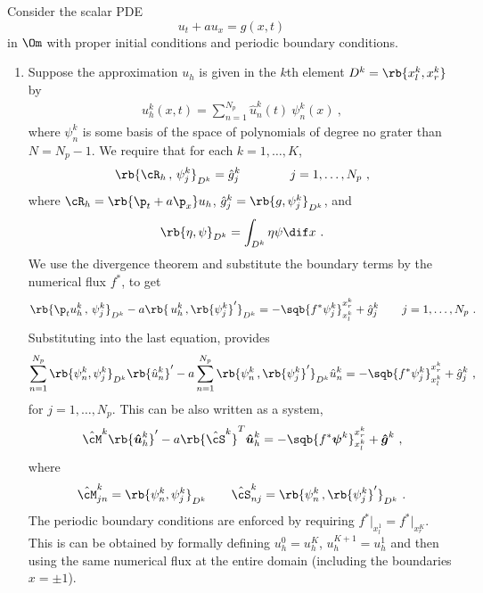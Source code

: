 \documentclass{article}
\def\hbu{\boldsymbol{\hat u}}
\def\bpsi{\boldsymbol{\psi}}
\def\bpsi{\boldsymbol{\psi}}
\def\hbForce{\boldsymbol{\hat g}}
\begin{document}
\begin{exerciseList}
\item
Consider the scalar PDE
\begin{equation}
	u_t+au_x=g(x,t)
\end{equation}
in $\Om$ with proper initial conditions and periodic boundary conditions.
\begin{enumerate}

\item
Suppose the approximation $u_h$ is given in the $k$th element $D^k=\rb{x_l^k,x_r^k}$ by
\begin{gather} \label{uh_def}
	u_h^k(x,t)=\sum_{n=1}^{N_p} \hat u_n^k(t)\ \psi_n^k(x)\ ,
\end{gather}
where $\psi_n^k$ is some basis of the space of polynomials of degree no grater than $N=N_p-1$.
We require that for each $k=1,\ldots,K$,
\begin{gather}
	\rb{\cR_h\, ,\, \psi_j^k}_{D^k}=\hat g_j^k
	\qquad\qquad j=1,\ldots,N_p\ ,
\end{gather}
where $\cR_h=\rb{\p_t+a\p_x}u_h$, $\hat g_j^k=\rb{g,\psi_j^k}_{D^k}$, and
\begin{gather}
	\rb{\eta,\psi}_{D^k}=\int_{D^k} \eta\psi\dif x\ .
\end{gather}
We use the divergence theorem and substitute the boundary terms by the numerical flux $f^*$, to get
\begin{gather}
	\rb{\p_t u_h^k\, ,\, \psi_j^k}_{D^k} -a\rb{\, u_h^k\, ,\rb{\psi_j^{k}}'}_{D^k}
		=-\sqb{f^*\psi_j^k}_{x_l^k}^{x_r^k}+\hat g_j^k
	\qquad
	j=1,\ldots,N_p\ .
\end{gather}
Substituting  into the last equation, provides
\begin{gather}
	\sum_{n=1}^{N_p} \rb{\psi_n^k, \psi_j^k}_{D^k} \rb{\hat u_n^k}'
		-a \sum_{n=1}^{N_p} \rb{\psi_n^k\, , \rb{\psi_j^k}'}_{D^k}\hat u_n^k
	=-\sqb{f^*\psi_j^k}_{x_l^k}^{x_r^k}+\hat g_j^k\ ,
\end{gather}
for $j=1,\ldots,N_p$.
This can be also written as a system,
\begin{gather} \label{dg2}
	\hat\cM^k \rb{\hbu_h^k}'-a\rb{\hat\cS^k}^T\hbu_h^k
		=-\sqb{f^*\bpsi^k}_{x_l^k}^{x_r^k}+\hbForce^k\ ,
\end{gather}
where
\begin{gather}
	\hat\cM^k_{jn}=\rb{\psi_n^k,\psi_j^k}_{D^k}
	\qquad
	\hat\cS^k_{nj}=\rb{\psi_n^k\, , \rb{\psi_j^k}'}_{D^k}\ .
\end{gather}
The periodic boundary conditions are enforced by requiring $f^*\big|_{x_l^1}=f^*\big|_{x_r^K}$.
This is can be obtained by formally defining $u_h^0=u_h^K$, $u_h^{K+1}=u_h^1$ and then using the same numerical flux at the entire domain (including the boundaries $x=\pm1$).


\end{enumerate}
\end{exerciseList}
\end{document}
